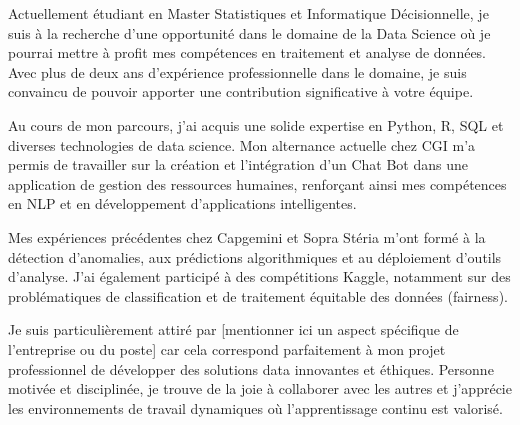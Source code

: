 \documentclass[11pt, a4paper]{awesome-cv} %
\begin{document}
\makecvheader %

\makelettertitle %


\begin{cvletter}



Actuellement étudiant en Master Statistiques et Informatique Décisionnelle, je suis à la recherche d'une opportunité dans le domaine de la Data Science où je pourrai mettre à profit mes compétences en traitement et analyse de données. Avec plus de deux ans d'expérience professionnelle dans le domaine, je suis convaincu de pouvoir apporter une contribution significative à votre équipe.



Au cours de mon parcours, j'ai acquis une solide expertise en Python, R, SQL et diverses technologies de data science. Mon alternance actuelle chez CGI m'a permis de travailler sur la création et l'intégration d'un Chat Bot dans une application de gestion des ressources humaines, renforçant ainsi mes compétences en NLP et en développement d'applications intelligentes.

Mes expériences précédentes chez Capgemini et Sopra Stéria m'ont formé à la détection d'anomalies, aux prédictions algorithmiques et au déploiement d'outils d'analyse. J'ai également participé à des compétitions Kaggle, notamment sur des problématiques de classification et de traitement équitable des données (fairness).



Je suis particulièrement attiré par [mentionner ici un aspect spécifique de l'entreprise ou du poste] car cela correspond parfaitement à mon projet professionnel de développer des solutions data innovantes et éthiques. Personne motivée et disciplinée, je trouve de la joie à collaborer avec les autres et j'apprécie les environnements de travail dynamiques où l'apprentissage continu est valorisé.


\end{cvletter}


\makeletterclosing %
\end{document}
